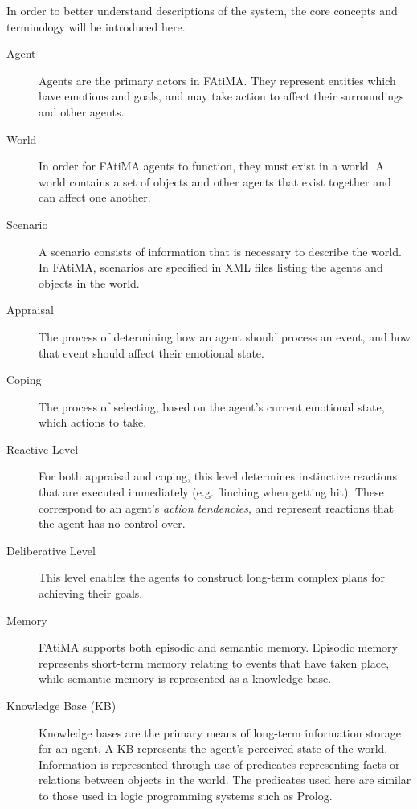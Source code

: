\documentclass{article}
\begin{document}
In order to better understand descriptions of the system, the core concepts and 
terminology will be introduced here.

\begin{description}

\item[Agent]
  Agents are the primary actors in FAtiMA.  They represent entities which have emotions
  and goals, and may take action to affect their surroundings and other agents.

\item[World]
  In order for FAtiMA agents to function, they must exist in a world.  A world contains
  a set of objects and other agents that exist together and can affect one another.

\item[Scenario]
  A scenario consists of information that is necessary to describe the world.  In
  FAtiMA, scenarios are specified in XML files listing the agents and objects
  in the world.

\item[Appraisal]
  The process of determining how an agent should process an event, and how that event should
  affect their emotional state.
  
\item[Coping]
  The process of selecting, based on the agent's current emotional state, which actions to
  take.

\item[Reactive Level]
  For both appraisal and coping, this level determines instinctive reactions that are
  executed immediately (e.g. flinching when getting hit).  These correspond to an
  agent's \emph{action tendencies}, and represent reactions that the agent has
  no control over.

\item[Deliberative Level]
  This level enables the agents to construct long-term complex plans for achieving
  their goals.

\item[Memory]
  FAtiMA supports both episodic and semantic memory.  Episodic memory represents 
  short-term memory relating to events that have taken place, while semantic
  memory is represented as a knowledge base.

\item[Knowledge Base (KB)]
  Knowledge bases are the primary means of long-term information storage for
  an agent.  A KB represents the agent's perceived state of the world.  Information
  is represented through use of predicates representing facts or relations
  between objects in the world.  The predicates used here are similar to those
  used in logic programming systems such as Prolog.


\end{description}
\end{document}
